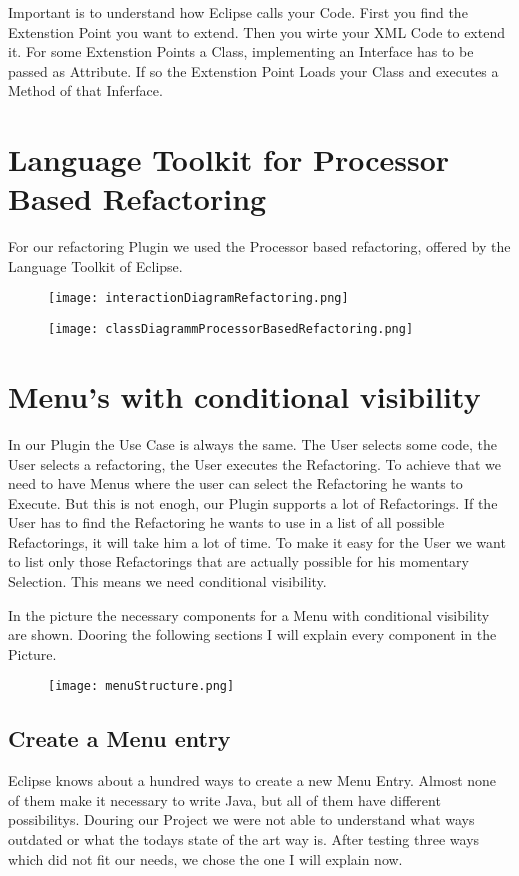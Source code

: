 \documentclass[a4paper,10pt]{report}
\begin{document}
Important is to understand how Eclipse calls your Code. First you find the Extenstion Point you want to extend. Then you wirte your XML Code to extend it. For some Extenstion Points a Class, implementing an Interface has to be passed as Attribute. If so the Extenstion Point Loads your Class and executes a Method of that Inferface.


\chapter{Language Toolkit for Processor Based Refactoring}
For our refactoring Plugin we used the Processor based refactoring, offered by the Language Toolkit of Eclipse. 
\begin{figure}[h]
\centering
\texttt{[image: interactionDiagramRefactoring.png]}
\end{figure}

\begin{figure}[h]
\centering
\texttt{[image: classDiagrammProcessorBasedRefactoring.png]}
\end{figure}



\chapter{Menu's with conditional visibility}
In our Plugin the Use Case is always the same. The User selects some code, the User selects a refactoring, the User executes the Refactoring. To achieve that we need to have Menus where the user can select the Refactoring he wants to Execute.
But this is not enogh, our Plugin supports a lot of Refactorings. If the User has to find the Refactoring he wants to use in a list of all possible Refactorings, it will take him a lot of time.
To make it easy for the User we want to list only those Refactorings that are actually possible for his momentary Selection. This means we need conditional visibility.

In the picture the necessary components for a Menu with conditional visibility are shown. Dooring the following sections I will explain every component in the Picture.
\begin{figure}[h]
\centering
\texttt{[image: menuStructure.png]}
\end{figure}

\section{Create a Menu entry}
Eclipse knows about a hundred ways to create a new Menu Entry. Almost none of them make it necessary to write Java, but all of them have different possibilitys. 
Douring our Project we were not able to understand what ways outdated or what the todays state of the art way is. After testing three ways which did not fit our needs,
we chose the one I will explain now. 
\end{document}
